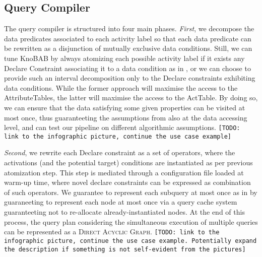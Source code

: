 \subsection{Query Compiler}
The query compiler is structured into four main phases. \textit{First}, we decompose the data predicates associated to each activity label so that each data predicate can be rewritten as a disjunction of mutually exclusive data conditions. Still, we can tune KnoBAB by always atomizing each possible activity label if it exists any Declare Constraint associating it to a data condition as in \cite{bpm21}, or we can choose to provide such an interval decomposition only to the Declare constraints exhibiting data conditions. While the former approach will maximise the access to the \textsf{AttributeTable}s, the latter will maximise the access to the \textsf{ActTable}. By doing so, we can ensure that the data satisfying some given properties can be visited at most once, thus guaranteeting the assumptions from \cite{BellatrecheKB21} also at the data accessing level, and can test our pipeline on different algorithmic assumptions. \texttt{\color{red}[TODO: link to the infographic picture, continue the use case example]}

\textit{Second}, we rewrite each Declare constraint as a set of \xLTLf operators, where the activations (and the potential target) conditions are instantiated as per previous atomization step. This step is mediated through a configuration file loaded at warm-up time, where novel declare constraints can be expressed as combination of such operators. We guarantee to represent each subquery at most once as in \cite{BellatrecheKB21} by guaraneeting to represent each node at most once via a query cache system guaranteeting not to re-allocate already-instantiated nodes. At the end of this process, the query plan considering the simultaneous execution of multiple queries can be represented as a \textsc{Direct Acyclic Graph}.  \texttt{\color{red}[TODO: link to the infographic picture, continue the use case example. Potentially expand the description if something is not self-evident from the pictures]}

